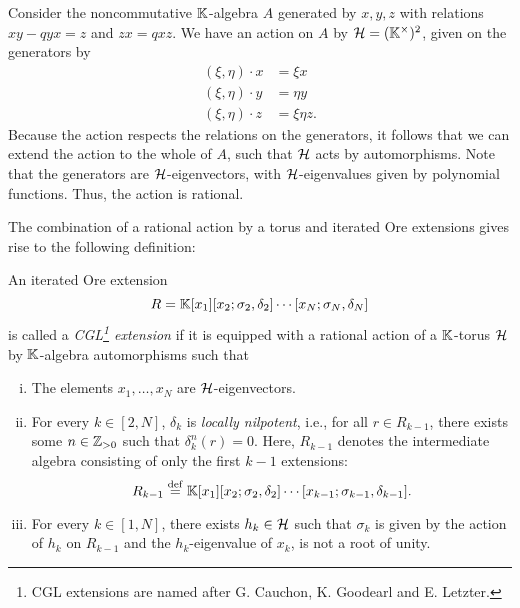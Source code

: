 \begin{example}
	Consider the noncommutative $\mathbb{K}$-algebra $A$ generated by $x,y,z$ with relations $xy
		-qyx = z$ and $zx = qxz$. We have an action on $A$ by $\mathcal{H} = (\mathbb{K}^\times)^2$, given
	on the generators by
	\begin{align*}
		(\xi, \eta)\cdot x & = \xi x      \\
		(\xi, \eta)\cdot y & = \eta y     \\
		(\xi, \eta)\cdot z & = \xi\eta z.
	\end{align*}
	Because the action respects the relations on the generators, it follows that we can
	extend the action to the whole of $A$, such that $\mathcal{H}$ acts by automorphisms. Note
	that the generators are $\mathcal{H}$-eigenvectors, with $\mathcal{H}$-eigenvalues given by
	polynomial functions. Thus, the action is rational.

\end{example}

The combination of a rational action by a torus and iterated Ore extensions gives rise
to the following definition:
\begin{definition}\label{def:cgl_extension}
	An iterated Ore extension
	\begin{equation*}
		R = \mathbb{K}[x_1][x_2; \sigma_2, \delta_2]\cdots [x_N; \sigma_N, \delta_N]
	\end{equation*}
	is called a \emph{CGL\footnote{CGL extensions are named after G. Cauchon, K. Goodearl
			and E. Letzter.} extension} if it is equipped with a rational
	action of a $\mathbb{K}$-torus $\mathcal{H}$ by $\mathbb{K}$-algebra automorphisms such that
	\begin{enumerate}[(i)]
		\item\label{itm:x_i-eigenvectors} The elements $x_1, \dots, x_N$ are $\mathcal{H}$-eigenvectors.
		\item For every $k\in [2, N]$, $\delta_k$ is \emph{locally
			      nilpotent}, i.e., for all $r \in R_{k-1}$, there exists some
		      $n \in \mathbb{Z}_{>0}$ such that $\delta_k^n (r) = 0$. Here, $R_{k-1}$ denotes the
		      intermediate algebra consisting of only the first $k-1$ extensions:
		      \begin{equation*}
			      R_{k-1} \overset{\mathrm{def}}{=} \mathbb{K}[x_1][x_2; \sigma_2, \delta_2]\cdots[x_{k-1};\sigma_{k-1}, \delta_{k-1}].
		      \end{equation*}
		      \item\label{itm:sigma_k-is-h_k} For every $k \in [1, N]$, there exists $h_k \in \mathcal{H}$ such that $\sigma_k$ is given by the action of $h_k$ on $R_{k-1}$ and the $h_k$-eigenvalue of $x_k$, is not a root of unity.
	\end{enumerate}
\end{definition}

